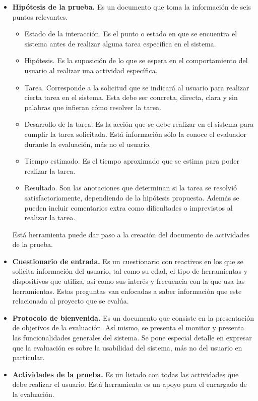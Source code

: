 \begin{itemize}
  \item \textbf{Hipótesis de la prueba.} Es un documento que toma la información de seis puntos relevantes.
  \begin{itemize}
    \item Estado de la interacción. Es el punto o estado en que se encuentra el sistema antes de realizar alguna tarea específica en el sistema.
    \item Hipótesis. Es la suposición de lo que se espera en el comportamiento del usuario al realizar una actividad específica.
    \item Tarea. Corresponde a la solicitud que se indicará al usuario para realizar cierta tarea en el sistema. Esta debe ser concreta, directa, clara y sin palabras que infieran cómo resolver la tarea.
    \item Desarrollo de la tarea. Es la acción que se debe realizar en el sistema para cumplir la tarea solicitada. Está información sólo la conoce el evaluador durante la evaluación, más no el usuario.
    \item Tiempo estimado. Es el tiempo aproximado que se estima para poder realizar la tarea.
    \item Resultado. Son las anotaciones que determinan si la tarea se resolvió satisfactoriamente, dependiendo de la hipótesis propuesta. Además se pueden incluir comentarios extra como dificultades o imprevistos al realizar la tarea.
  \end{itemize}
  Está herramienta puede dar paso a la creación del documento de actividades de la prueba.
  \item \textbf{Cuestionario de entrada.} Es un cuestionario con reactivos en los que se solicita información del usuario, tal como su edad, el tipo de herramientas y dispositivos que utiliza, así como sus interés y frecuencia con la que usa las herramientas. Estas preguntas van enfocadas a saber información que este relacionada al proyecto que se evalúa.
  \item \textbf{Protocolo de bienvenida.} Es un documento que consiste en la presentación de objetivos de la evaluación. Así mismo, se presenta el monitor y presenta las funcionalidades generales del sistema. Se pone especial detalle en expresar que la evaluación es sobre la usabilidad del sistema, más no del usuario en particular.
  \item \textbf{Actividades de la prueba.} Es un listado con todas las actividades que debe realizar el usuario. Está herramienta es un apoyo para el encargado de la evaluación.

\end{itemize}

